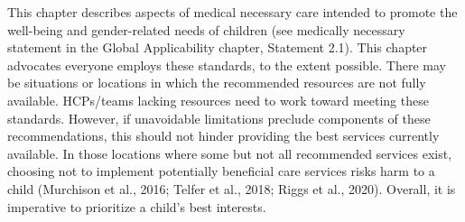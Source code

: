 \documentclass[
]{book}
\begin{document}
This chapter describes aspects of medical necessary care intended to promote the well-being
and gender-related needs of children (see medically necessary statement in the Global Applicability
chapter, Statement 2.1). This chapter advocates
everyone employs these standards, to the extent
possible. There may be situations or locations in
which the recommended resources are not fully
available. HCPs/teams lacking resources need to
work toward meeting these standards. However, if
unavoidable limitations preclude components of
these recommendations, this should not hinder
providing the best services currently available. In
those locations where some but not all recommended services exist, choosing not to implement
potentially beneficial care services risks harm to
a child (Murchison et al., 2016; Telfer et al., 2018;
Riggs et al., 2020). Overall, it is imperative to
prioritize a child's best interests.
\end{document}
